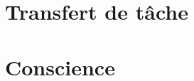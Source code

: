 \documentclass[11pt]{beamer}
\begin{document}
\section{Transfert de tâche}
\begin{frame}\transwipe

\end{frame}

\begin{frame}\transwipe

\end{frame}
\section{Conscience}
\begin{frame}\transwipe

\end{frame}
\end{document}
